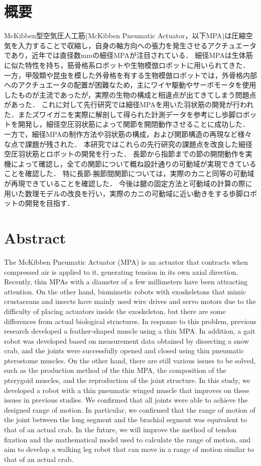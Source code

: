 \newpage
\section*{概要}
McKibben型空気圧人工筋(McKibben Pneumatic Actuator，以下MPA)は圧縮空気を入力することで収縮し，自身の軸方向への張力を発生させるアクチュエータであり，近年では直径数mmの細径MPAが注目されている．
細径MPAは生体筋に似た特性を持ち，筋骨格系ロボットや生物模倣ロボットに用いられてきた．
一方，甲殻類や昆虫を模した外骨格を有する生物模倣ロボットでは，外骨格内部へのアクチュエータの配置が困難なため，主にワイヤ駆動やサーボモータを使用したものが主流であったが，実際の生物の構成と相違点が出てきてしまう問題点があった．
これに対して先行研究では細径MPAを用いた羽状筋の開発が行われた．またズワイガニを実際に解剖して得られた計測データを参考にし歩脚ロボットを開発し，細径空圧羽状筋によって関節を開閉動作させることに成功した．
一方で，細径MPAの制作方法や羽状筋の構成，および関節構造の再現など様々な点で課題が残された．
本研究ではこれらの先行研究の課題点を改良した細径空圧羽状筋とロボットの開発を行った．
長節から指節までの節の開閉動作を実機によって確認し，全ての関節について概ね設計通りの可動域が実現できていることを確認した．
特に長節-腕節間関節については，実際のカニと同等の可動域が再現できていることを確認した．
今後は腱の固定方法と可動域の計算の際に用いた数理モデルの改良を行い，実際のカニの可動域に近い動きをする歩脚ロボットの開発を目指す．
\newpage
\section*{Abstract}
The McKibben Pneumatic Actuator (MPA) is an actuator that contracts when compressed air is applied to it, generating tension in its own axial direction.
Recently, thin MPAs with a diameter of a few millimeters have been attracting attention.
On the other hand, biomimetic robots with exoskeletons that mimic crustaceans and insects have mainly used wire drives and servo motors due to the difficulty of placing actuators inside the exoskeleton, but there are some differences from actual biological structures.
In response to this problem, previous research developed a feather-shaped muscle using a thin MPA. In addition, a gait robot was developed based on measurement data obtained by dissecting a snow crab, and the joints were successfully opened and closed using thin pneumatic pterostome muscles.
On the other hand, there are still various issues to be solved, such as the production method of the thin MPA, the composition of the pterygoid muscles, and the reproduction of the joint structure.
In this study, we developed a robot with a thin pneumatic winged muscle that improves on these issues in previous studies.
We confirmed that all joints were able to achieve the designed range of motion.
In particular, we confirmed that the range of motion of the joint between the long segment and the brachial segment was equivalent to that of an actual crab.
In the future, we will improve the method of tendon fixation and the mathematical model used to calculate the range of motion, and aim to develop a walking leg robot that can move in a range of motion similar to that of an actual crab.